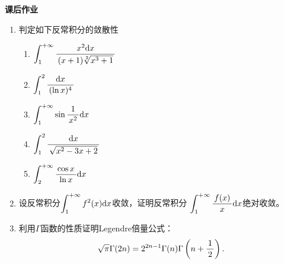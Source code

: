 \begin{ext}
	{\bf 课后作业}	
	\begin{enumerate}
	  \item 判定如下反常积分的敛散性
	  \begin{enumerate}[(1)]
	    \item $\dint_1^{+\infty}\df{x^2\d x}{(x+1)\sqrt[2]{x^3+1}}$
	    \item $\dint_1^2\df{\d x}{(\ln x)^4}$
	    \item $\dint_1^{+\infty}\sin\df1{x^2}\d x$
	    \item $\dint_1^2\df{\d x}{\sqrt{x^2-3x+2}}$
	    \item $\dint_2^{+\infty}\df{\cos x}{\ln x}\d x$
	  \end{enumerate}
	  \item 设反常积分$\dint_1^{+\infty}f^2(x)\d x$收敛，证明反常积分
	  $\dint_1^{+\infty}\df{f(x)}x\d x$绝对收敛。
	  \item 利用$\Gamma$函数的性质证明{\kaishu Legendre倍量公式}：
	  $$\sqrt{\pi}\Gamma(2n)=2^{2n-1}\Gamma(n)\Gamma\left(n+\df12\right).$$
	\end{enumerate}
\end{ext}